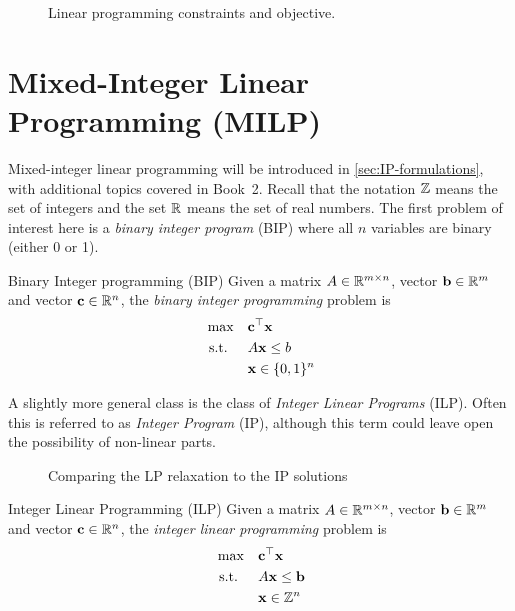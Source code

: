 \begin{figure}
\caption{Linear programming constraints and objective.}
\end{figure}

\section{Mixed-Integer Linear Programming (MILP)}
\label{sec:intro-MILP}
Mixed-integer linear programming will be introduced in \autoref{sec:IP-formulations}, with additional topics covered in Book~2.
Recall that the notation $\mathbb{Z}$ means the set of integers and the set $\mathbb{R}$ means the set of real numbers.  The first problem of interest here is a \emph{binary integer program} (BIP) where all $n$ variables are binary (either 0 or 1).

\begin{general}{Binary Integer programming (BIP)}{\npcomplete}
Given a matrix $A \in \mathbb{R}^{m\times n}$, vector $\mathbf{b} \in \mathbb{R}^m$ and vector $\mathbf{c} \in \mathbb{R}^n$, the \emph{binary integer programming} problem is
\begin{equation}
\label{eq:BIP}
\begin{split}
\max \quad & \mathbf{c}^\top \mathbf{x}\\
\text{ s.t. }  \quad & A\mathbf{x} \leq b\\
& \mathbf{x} \in \{0,1\}^n
\end{split}
\end{equation}
\end{general}
A slightly more general class is the class of \emph{Integer Linear Programs} (ILP).  Often this is referred to as \emph{Integer Program} (IP), although this term could leave open the possibility of non-linear parts.


\begin{figure}
\caption{Comparing the LP relaxation to the IP solutions}
\end{figure}

\begin{general}{Integer Linear Programming (ILP)}{\npcomplete}
Given a matrix $A \in \mathbb{R}^{m\times n}$, vector $\mathbf{b} \in \mathbb{R}^m$ and vector $\mathbf{c} \in \mathbb{R}^n$, the \emph{integer linear programming} problem is
\begin{equation}
\label{eq:ILP}
\begin{split}
\max \quad & \mathbf{c}^\top \mathbf{x}\\
\text{ s.t. }  \quad & A\mathbf{x} \leq \mathbf{b}\\
& \mathbf{x} \in \mathbb{Z}^n
\end{split}
\end{equation}
\end{general}

